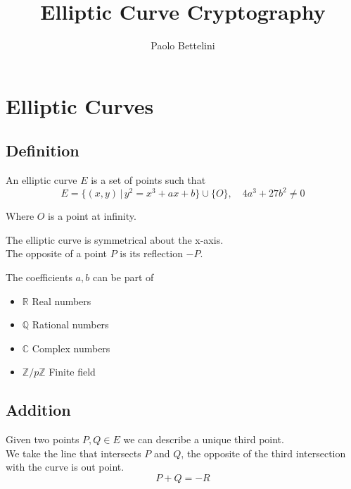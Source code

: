 \documentclass[a4paper]{article}
\title{Elliptic Curve Cryptography}
\author{Paolo Bettelini}
\date{}
\begin{document}
\maketitle
\tableofcontents
\pagebreak

\section{Elliptic Curves}

\subsection{Definition}

An elliptic curve \(E\) is a set of points such that
\[
	E=\{(x,y)\,|\,y^2=x^3+ax+b\}\cup\{O\},\quad 4a^3+27b^2\neq 0
\]

\begin{center}
\end{center}
Where \(O\) is a point at infinity.

The elliptic curve is symmetrical about the x-axis.\\
The opposite of a point \(P\) is its reflection \(-P\).

The coefficients \(a,b\) can be part of
\begin{itemize}
	\item \(\mathbb{R}\) Real numbers
	\item \(\mathbb{Q}\) Rational numbers
	\item \(\mathbb{C}\) Complex numbers
	\item \(\mathbb{Z}/p\mathbb{Z}\) Finite field
\end{itemize}

\subsection{Addition}

Given two points \(P,Q\in E\) we can describe a unique third point.\\
We take the line that intersects \(P\) and \(Q\), the opposite of the third intersection with the curve is out point.
\[
	P+Q=-R
\]
\end{document}
